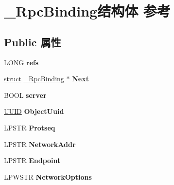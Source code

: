 \hypertarget{struct___rpc_binding}{}\section{\+\_\+\+Rpc\+Binding结构体 参考}
\label{struct___rpc_binding}
\subsection*{Public 属性}
\begin{DoxyCompactItemize}
\item 
\mbox{\label{struct___rpc_binding_a27f1c7955bbb16483e70ac1d6357793c}} 
L\+O\+NG {\bfseries refs}
\item 
\mbox{\label{struct___rpc_binding_a1ca30b917dab2fa4dcb35795f1bcdf22}} 
\hyperlink{interfacestruct}{struct} \hyperlink{struct___rpc_binding}{\+\_\+\+Rpc\+Binding} $\ast$ {\bfseries Next}
\item 
\mbox{\label{struct___rpc_binding_a02d478855a1bbdad3c53ecfc7c673937}} 
B\+O\+OL {\bfseries server}
\item 
\mbox{\label{struct___rpc_binding_ae7a3666a5b3157370ed29682a51dbc1e}} 
\hyperlink{interface_g_u_i_d}{U\+U\+ID} {\bfseries Object\+Uuid}
\item 
\mbox{\label{struct___rpc_binding_abf7652b6a027ef1555d4167b95925978}} 
L\+P\+S\+TR {\bfseries Protseq}
\item 
\mbox{\label{struct___rpc_binding_a3b5cbd0455d4eae998a59b84f73d982a}} 
L\+P\+S\+TR {\bfseries Network\+Addr}
\item 
\mbox{\label{struct___rpc_binding_aafabcf8775a6d9e65cf7720173521a37}} 
L\+P\+S\+TR {\bfseries Endpoint}
\item 
\mbox{\label{struct___rpc_binding_a5c45c6f51b29e80e10bb37370c5392b6}} 
L\+P\+W\+S\+TR {\bfseries Network\+Options}
\item 
\mbox{\label{struct___rpc_binding_a1bc5f1e4a5c0dba76d60e2ab8e41f94a}} 

\end{DoxyCompactItemize}
